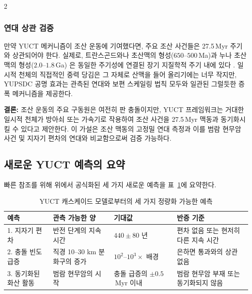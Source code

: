\documentclass[12pt,a4paper]{article}
\begin{document}
\begin{multicols}{2}
		\subsubsection{연대 상관 검증}
		만약 YUCT 메커니즘이 조산 운동에 기여했다면, 주요 조산 사건들은 27.5 Myr 주기와 상관되어야 한다. 실제로, 트란스곤드와나 초산맥의 형성(\(650\)–\(500\) Ma)과 누나 초산맥의 형성(\(2.0\)–\(1.8\) Ga) \cite{CampbellAllen2008}은 동일한 주기성에 연결된 장기 지질학적 주기 내에 있다 \cite{Rampino2021}. 일시적 천체의 직접적인 중력 당김은 그 자체로 산맥을 들어 올리기에는 너무 작지만, YUPSDC 공명 효과는 관측된 연대와 보편 스케일링 법칙 모두와 일관된 그럴듯한 증폭 메커니즘을 제공한다.
		
		\vspace{0.3cm}
		\noindent
		\textbf{결론:} 조산 운동의 주요 구동원은 여전히 판 충돌이지만, YUCT 프레임워크는 거대한 일시적 천체가 방아쇠 또는 가속기로 작용하여 조산 사건을 27.5 Myr 맥동과 동기화시킬 수 있다고 제안한다. 이 가설은 조산 맥동의 고정밀 연대 측정과 이를 범람 현무암 사건 및 지자기 편차의 연대와 비교함으로써 검증 가능하다.
		
	\end{multicols}
	
	\subsection{새로운 YUCT 예측의 요약}
	빠른 참조를 위해 위에서 공식화된 세 가지 새로운 예측을 표~\ref{tab:new_predictions}에 요약한다.
	
	\begin{table}[H]
		\centering
		\small
		\caption{YUCT 캐스케이드 모델로부터의 세 가지 정량화 가능한 예측}
		\label{tab:new_predictions}
		\begin{tabular}{p{3.9cm} p{4.4cm} p{4.7cm} p{4.0cm}}
			\toprule
			\textbf{예측} & \textbf{관측 가능한 양} & \textbf{기대값} & \textbf{반증 기준} \\
			\midrule
			1. 지자기 편차 & 반전 단계의 지속 시간 & \(440 \pm 80\) 년 & 편차 없음 또는 현저히 다른 지속 시간 \\
			2. 충돌 빈도 급증 & 직경 10–30 km 분화구의 증가 & \(10^{2}\)–\(10^{3}\times\) 배경 & 은하면 통과와의 상관 없음 \\
			3. 동기화된 화산 활동 & 범람 현무암의 시작 & 충돌 급증의 \(\pm 0.5\) Myr 이내 & 범람 현무암 부재 또는 동기화되지 않음 \\
			\bottomrule
		\end{tabular}
	\end{table}
	
\end{document}
